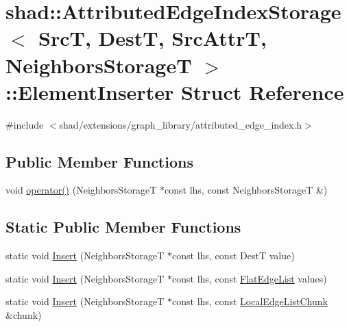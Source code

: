 \hypertarget{structshad_1_1AttributedEdgeIndexStorage_1_1ElementInserter}{\section{shad\-:\-:Attributed\-Edge\-Index\-Storage$<$ Src\-T, Dest\-T, Src\-Attr\-T, Neighbors\-Storage\-T $>$\-:\-:Element\-Inserter Struct Reference}
\label{structshad_1_1AttributedEdgeIndexStorage_1_1ElementInserter}
}


{\ttfamily \#include $<$shad/extensions/graph\-\_\-library/attributed\-\_\-edge\-\_\-index.\-h$>$}

\subsection*{Public Member Functions}
\begin{DoxyCompactItemize}
\item 
void \hyperlink{structshad_1_1AttributedEdgeIndexStorage_1_1ElementInserter_ac70e7e4b1c739464e219ea75c91fac3a}{operator()} (Neighbors\-Storage\-T $\ast$const lhs, const Neighbors\-Storage\-T \&)
\end{DoxyCompactItemize}
\subsection*{Static Public Member Functions}
\begin{DoxyCompactItemize}
\item 
static void \hyperlink{structshad_1_1AttributedEdgeIndexStorage_1_1ElementInserter_a1faafb7158a81c496ad8ad8171064609}{Insert} (Neighbors\-Storage\-T $\ast$const lhs, const Dest\-T value)
\item 
static void \hyperlink{structshad_1_1AttributedEdgeIndexStorage_1_1ElementInserter_a144624fe0798918fe093ca4e63a15cfc}{Insert} (Neighbors\-Storage\-T $\ast$const lhs, const \hyperlink{structshad_1_1AttributedEdgeIndexStorage_1_1FlatEdgeList}{Flat\-Edge\-List} values)
\item 
static void \hyperlink{structshad_1_1AttributedEdgeIndexStorage_1_1ElementInserter_aee06160fc43529b777c906dee99cd39e}{Insert} (Neighbors\-Storage\-T $\ast$const lhs, const \hyperlink{structshad_1_1AttributedEdgeIndexStorage_1_1LocalEdgeListChunk}{Local\-Edge\-List\-Chunk} \&chunk)
\end{DoxyCompactItemize}


